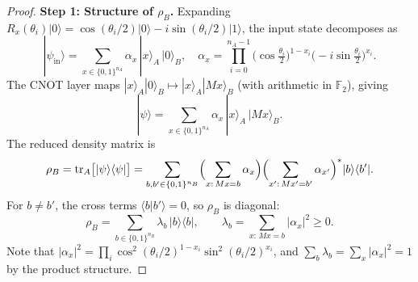 \documentclass[11pt,a4paper]{article}
\newcommand{\F}{\mathbb{F}}
\begin{document}
\begin{proof}
\textbf{Step 1: Structure of $\rho_B$.}
Expanding $R_x(\theta_i)|0\rangle = \cos(\theta_i/2)|0\rangle - i\sin(\theta_i/2)|1\rangle$,
the input state decomposes as
\begin{equation}
  |\psi_{\mathrm{in}}\rangle
  = \sum_{x \in \{0,1\}^{n_A}} \alpha_x\, |x\rangle_A\, |0\rangle_B,
  \quad
  \alpha_x = \prod_{i=0}^{n_A-1}
  \bigl(\cos\tfrac{\theta_i}{2}\bigr)^{1-x_i}
  \bigl(-i\sin\tfrac{\theta_i}{2}\bigr)^{x_i}.
  \label{eq:alpha}
\end{equation}
The CNOT layer maps $|x\rangle_A|0\rangle_B \mapsto |x\rangle_A|Mx\rangle_B$
(with arithmetic in $\F_2$), giving
\begin{equation}
  |\psi\rangle = \sum_{x \in \{0,1\}^{n_A}} \alpha_x\, |x\rangle_A\, |Mx\rangle_B.
  \label{eq:output}
\end{equation}
The reduced density matrix is
\begin{equation}
  \rho_B
  = \operatorname{tr}_A\bigl[|\psi\rangle\langle\psi|\bigr]
  = \sum_{b,b' \in \{0,1\}^{n_B}}
    \Bigl(\sum_{x:\, Mx=b} \alpha_x\Bigr)
    \Bigl(\sum_{x':\, Mx'=b'} \alpha_{x'}\Bigr)^*
    |b\rangle\langle b'|.
\end{equation}
For $b \neq b'$, the cross terms $\langle b|b'\rangle = 0$, so
$\rho_B$ is diagonal:
\begin{equation}
  \rho_B = \sum_{b \in \{0,1\}^{n_B}} \lambda_b\, |b\rangle\langle b|,
  \qquad
  \lambda_b = \sum_{x:\, Mx = b} |\alpha_x|^2 \geq 0.
  \label{eq:eigenvalues}
\end{equation}
Note that $|\alpha_x|^2 = \prod_i \cos^2(\theta_i/2)^{1-x_i} \sin^2(\theta_i/2)^{x_i}$,
and $\sum_b \lambda_b = \sum_x |\alpha_x|^2 = 1$ by the product structure.


\end{proof}
\end{document}
